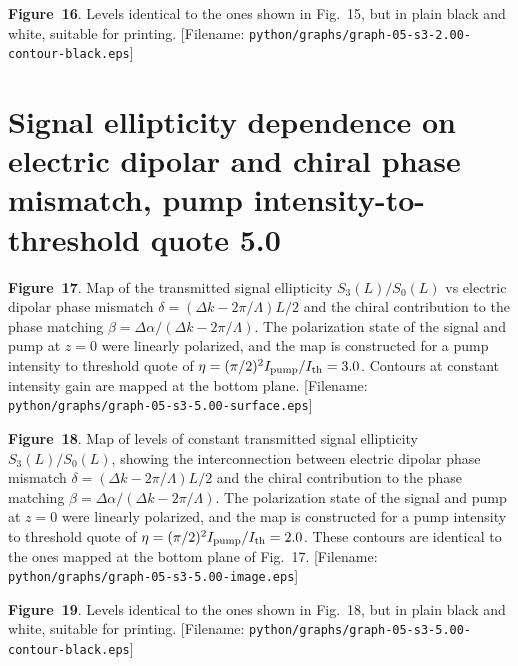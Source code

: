 \centerline{\epsfxsize=240pt}
\medskip
\noindent
{\bf Figure~16}.
Levels identical to the ones shown in Fig.~15, but in plain black and white,
suitable for printing.
[Filename: {\tt python/graphs/graph-05-s3-2.00-contour-black.eps}]
\vfill\eject

\section{Signal ellipticity dependence on electric dipolar and chiral
         phase mismatch, pump intensity-to-threshold quote 5.0}
\bigskip
\bigskip
\centerline{\epsfxsize=240pt}
\medskip
\noindent
{\bf Figure~17}.
Map of the transmitted signal ellipticity $S_3(L)/S_0(L)$ vs electric dipolar phase
mismatch $\delta=(\Delta k-2\pi/\Lambda)L/2$ and the chiral contribution to
the phase matching $\beta=\Delta\alpha/(\Delta k-2\pi/\Lambda)$.
The polarization state of the signal and pump at $z=0$ were linearly polarized,
and the map is constructed for a pump intensity to threshold quote of
$\eta=(\pi/2)^2I_{\rm pump}/I_{\rm th}=3.0$. Contours at constant intensity gain
are mapped at the bottom plane.
[Filename: {\tt python/graphs/graph-05-s3-5.00-surface.eps}]
\bigskip

\centerline{\epsfxsize=240pt}
\medskip
\noindent
{\bf Figure~18}.
Map of levels of constant transmitted signal ellipticity $S_3(L)/S_0(L)$,
showing the interconnection between electric dipolar phase mismatch
$\delta=(\Delta k-2\pi/\Lambda)L/2$ and the chiral contribution to the
phase matching $\beta=\Delta\alpha/(\Delta k-2\pi/\Lambda)$.
The polarization state of the signal and pump at $z=0$ were linearly polarized,
and the map is constructed for a pump intensity to threshold quote of
$\eta=(\pi/2)^2I_{\rm pump}/I_{\rm th}=2.0$.
These contours are identical to the ones mapped at the bottom plane of Fig.~17.
[Filename: {\tt python/graphs/graph-05-s3-5.00-image.eps}]
\vfill\eject

\centerline{\epsfxsize=240pt}
\medskip
\noindent
{\bf Figure~19}.
Levels identical to the ones shown in Fig.~18, but in plain black and white,
suitable for printing.
[Filename: {\tt python/graphs/graph-05-s3-5.00-contour-black.eps}]
\vfill\eject

\bye
